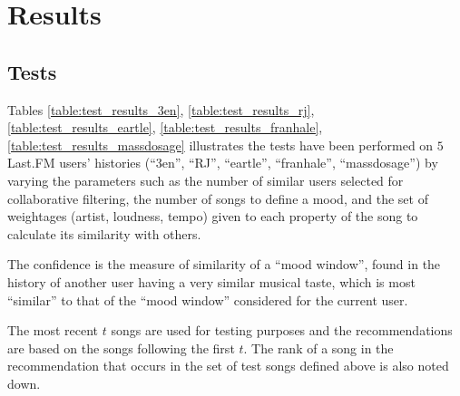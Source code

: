 \chapter{Results}
	\section{Tests}
		Tables \ref{table:test_results_3en}, \ref{table:test_results_rj}, \ref{table:test_results_eartle}, \ref{table:test_results_franhale}, \ref{table:test_results_massdosage} illustrates the tests have been performed on \(5\) Last.FM users' histories (``3en'', ``RJ'', ``eartle'', ``franhale'', ``massdosage'') by varying the parameters such as the number of similar users selected for collaborative filtering, the number of songs to define a mood, and the set of weightages (artist, loudness, tempo) given to each property of the song to calculate its similarity with others.

		The confidence is the measure of similarity of a ``mood window'', found in the history of another user having a very similar musical taste, which is most ``similar'' to that of the ``mood window'' considered for the current user.
		
		The most recent \(t\) songs are used for testing purposes and the recommendations are based on the songs following the first \(t\). The rank of a song in the recommendation that occurs in the set of test songs defined above is also noted down.
		
